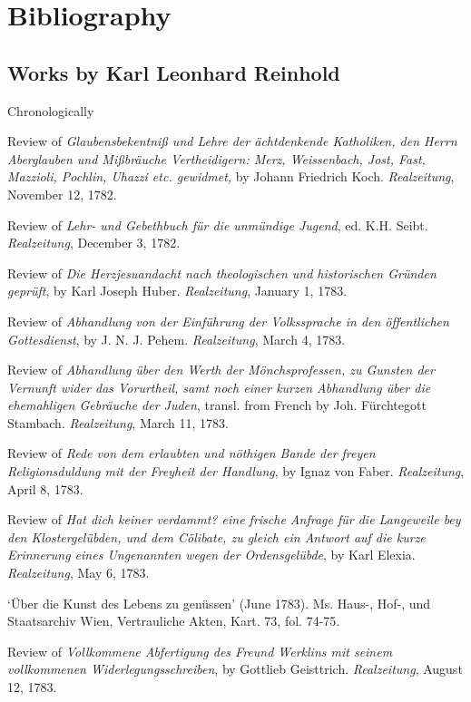 
\chapter{Bibliography}



\section{Works by Karl Leonhard Reinhold}


Chronologically 

Review of \textit{Glaubensbekentni\ss{} und Lehre der \"{a}chtdenkende Katholiken, den Herrn Aberglauben und Mi\ss{}br\"{a}uche Vertheidigern: Merz, Weissenbach, Jost, Fast, Mazzioli, Pochlin, Uhazzi etc. gewidmet, }by Johann Friedrich Koch. \textit{Realzeitung}, November 12, 1782.

Review of \textit{Lehr{-} und Gebethbuch f\"{u}r die unm\"{u}ndige Jugend}, ed. K.H. Seibt. \textit{Realzeitung}, December 3, 1782.

Review of \textit{Die Herzjesuandacht nach theologischen und historischen Gr\"{u}nden gepr\"{u}ft}, by Karl Joseph Huber. \textit{Realzeitung}, January 1, 1783. 

Review of \textit{Abhandlung von der Einf\"{u}hrung der Volkssprache in den \"{o}ffentlichen Gottesdienst}, by J. N. J. Pehem. \textit{Realzeitung}, March 4, 1783.

Review of \textit{Abhandlung \"{u}ber den Werth der M\"{o}nchsprofessen, zu Gunsten der Vernunft wider das Vorurtheil, samt noch einer kurzen Abhandlung \"{u}ber die ehemahligen Gebr\"{a}uche der Juden}, transl. from French by Joh. F\"{u}rchtegott Stambach. \textit{Realzeitung}, March 11, 1783.

Review of \textit{Rede von dem erlaubten und n\"{o}thigen Bande der freyen Religionsduldung mit der Freyheit der Handlung}, by Ignaz von Faber. \textit{Realzeitung}, April 8, 1783.

Review of \textit{Hat dich keiner verdammt? eine frische Anfrage f\"{u}r die Langeweile bey den Klostergel\"{u}bden, und dem C\"{o}libate, zu gleich ein Antwort auf die kurze Erinnerung eines Ungenannten wegen der Ordensgel\"{u}bde}, by Karl Elexia. \textit{Realzeitung}, May 6, 1783.

`\"{U}ber die Kunst des Lebens zu gen\"{u}ssen' (June 1783). Ms. Haus{-}, Hof{-}, und Staatsarchiv Wien, Vertrauliche Akten, Kart. 73, fol. 74{-}75.

Review of \textit{Vollkommene Abfertigung des Freund Werklins mit seinem vollkommenen Widerlegungsschreiben}, by Gottlieb Geisttrich. \textit{Realzeitung}, August 12, 1783.

